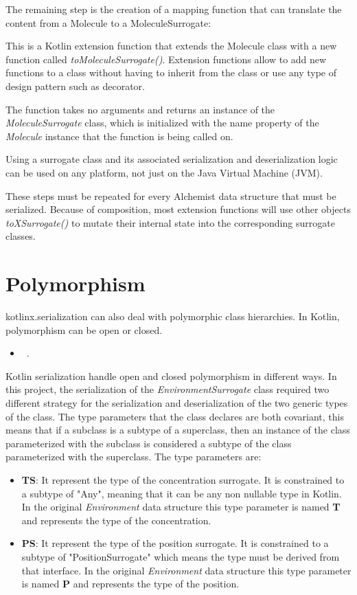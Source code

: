 The remaining step is the creation of a mapping function that can translate the content from a Molecule to a MoleculeSurrogate:

This is a Kotlin extension function that extends the Molecule class with a new function called \textit{toMoleculeSurrogate()}. Extension functions allow to add new functions to a class without having to inherit from the class or use any type of design pattern such as decorator.

The function takes no arguments and returns an instance of the \textit{MoleculeSurrogate} class, which is initialized with the name property of the \textit{Molecule} instance that the function is being called on.



Using a surrogate class and its associated serialization and deserialization logic can be used on any platform, not just on the Java Virtual Machine (JVM).

These steps must be repeated for every Alchemist data structure that must be serialized. Because of composition, most extension functions will use other objects \textit{toXSurrogate()} to mutate their internal state into the corresponding surrogate classes.

\section{Polymorphism}
\label{sec:polymorphism}

kotlinx.serialization can also deal with polymorphic class hierarchies. In Kotlin, polymorphism can be open or closed.
\begin{itemize}
	\item ~\cite{kotlinxs84:online}.
\end{itemize}


Kotlin serialization handle open and closed polymorphism in different ways. In this project, the serialization of the \textit{EnvironmentSurrogate} class required two different strategy for the serialization and deserialization of the two generic types of the class. The type parameters that the class declares are both covariant, this means that if a subclass is a subtype of a superclass, then an instance of the class parameterized with the subclass is considered a subtype of the class parameterized with the superclass. The type parameters are:
\begin{itemize}
	\item \textbf{TS}: It represent the type of the concentration surrogate. It is constrained to a subtype of "Any", meaning that it can be any non nullable type in Kotlin.
	In the original \textit{Environment} data structure this type parameter is named \textbf{T} and represents the type of the concentration.
	\item \textbf{PS}: It represent the type of the position surrogate. It is constrained to a subtype of "PositionSurrogate" which means the type must be derived from that interface. In the original \textit{Environment} data structure this type parameter is named \textbf{P} and represents the type of the position.
\end{itemize}
